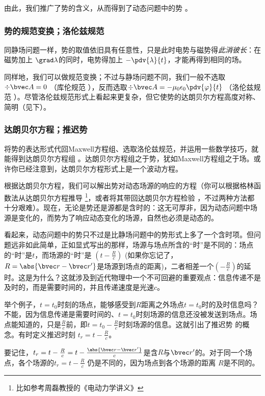 由此，我们推广了势的含义，从而得到了动态问题中的势 。

\subsubsection{势的规范变换；洛伦兹规范}
同静场问题一样，势的取值依旧具有任意性，只是此时电势与磁势得\textsl{此消彼长}：在磁势加上 $\grad \lambda$的同时，电势得加上 $ - \pdv{\lambda}{t}$，才能再得到相同的场。

同样地，我们可以做规范变换；不过与静场问题不同，我们一般不选取 $\div \bvec A =0$ （库伦规范 ），反而选取$\div \bvec A = -\mu_0 \epsilon_0 \pdv{\varphi}{t}~$（洛伦兹规范 ）。尽管洛伦兹规范形式上看起来更复杂，但它使势的达朗贝尔方程高度对称、简明（见下）。

\subsubsection{达朗贝尔方程；推迟势}
将势的表达形式代回Maxwell方程组、选取洛伦兹规范，并运用一些数学技巧，就能得到达朗贝尔方程组 。达朗贝尔方程组之于势，犹如Maxwell方程组之于场。或许你已经注意到，达朗贝尔方程形式上是一个波动方程。

根据达朗贝尔方程，我们可以解出势对动态场源的响应的方程（你可以根据格林函数法从达朗贝尔方程推导 \footnote{比如参考周磊教授的《电动力学讲义》}，或者将其带回达朗贝尔方程检验 \cite{GriffE}，不过两种方法都十分艰难）。现在，无论是势还是源都是含时的：这无可厚非，因为动态问题中场源是变化的，而势为了响应动态变化的场源，自然也必须是动态的。

看起来，动态问题中的势只不过是比静场问题中的势形式上多了一个含时项。但问题远非如此简单，正如显式写出的那样，场源与场点所含的“时”是不同的：场点的“时”是$t$，而场源的“时”是 $(t-\frac{R}{c})$ (如果你忘记了，$R = \abs{\bvec r-\bvec r'}$是场源到场点的距离)，二者相差一个$(-\frac{R}{c})$的延时。这是为什么？这就涉及到近代物理中一个不可回避的重要观点：信息传递不是及时的，而是需要时间的，并且传递速度是光速$c$。

举个例子，$t=t_0$时刻的场点，能够感受到$R$距离之外场点$t=t_0$时的及时信息吗？不能，因为信息传递是需要时间的、$t=t_0$时刻场源的信息还没被发送到场点。场点能知道的，只是$\frac{R}{c}$前，即$t=t_0-\frac{R}{c}$时刻场源的信息。这就引出了推迟势  的概念。有时定义推迟时刻 $t_r = t - \frac{R}{c}$。

要记住，$t_r = t-\frac{R}{c} = t-\frac{\abs{\bvec r-\bvec r'}}{c}$是含$R$与$\bvec r'$的。对于同一个场点，各个场源的$t_r = t - \frac{R}{c}$ 仍是不同的，因为场点到各个场源的距离 $R$是不同的。


